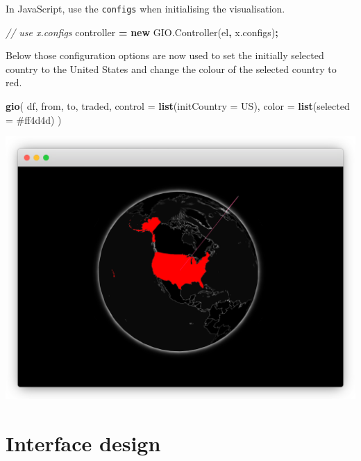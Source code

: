 \documentclass[
]{krantz}
\makeatletter
\newenvironment{Shaded}{\begin{snugshade}}{\end{snugshade}}
\newcommand{\AttributeTok}[1]{\textcolor[rgb]{0.61,0.61,0.61}{#1}}
\newcommand{\CommentTok}[1]{\textcolor[rgb]{0.37,0.37,0.37}{\textit{#1}}}
\newcommand{\DataTypeTok}[1]{\textcolor[rgb]{0.27,0.27,0.27}{#1}}
\newcommand{\KeywordTok}[1]{\textcolor[rgb]{0.27,0.27,0.27}{\textbf{#1}}}
\newcommand{\NormalTok}[1]{#1}
\newcommand{\OperatorTok}[1]{\textcolor[rgb]{0.43,0.43,0.43}{\textbf{#1}}}
\newcommand{\StringTok}[1]{\textcolor[rgb]{0.5,0.5,0.5}{#1}}
\newcommand{\VariableTok}[1]{\textcolor[rgb]{0,0,0}{#1}}
\newenvironment{kframe}{%
\medskip{}
\setlength{\fboxsep}{.8em}
 \def\at@end@of@kframe{}%
 \ifinner\ifhmode%
  \def\at@end@of@kframe{\end{minipage}}%
  \begin{minipage}{\columnwidth}%
 \fi\fi%
 \def\FrameCommand##1{\hskip\@totalleftmargin \hskip-\fboxsep
 \colorbox{shadecolor}{##1}\hskip-\fboxsep
     \hskip-\linewidth \hskip-\@totalleftmargin \hskip\columnwidth}%
 \MakeFramed {\advance\hsize-\width
   \@totalleftmargin\z@ \linewidth\hsize
   \@setminipage}}%
 {\par\unskip\endMakeFramed%
 \at@end@of@kframe}
\renewenvironment{Shaded}{\begin{kframe}}{\end{kframe}}
\makeatother
\begin{document}
In JavaScript, use the \texttt{configs} when initialising the visualisation.

\begin{Shaded}
\begin{Highlighting}[]
\CommentTok{// use x.configs}
\NormalTok{controller }\OperatorTok{=} \KeywordTok{new} \VariableTok{GIO}\NormalTok{.}\AttributeTok{Controller}\NormalTok{(el}\OperatorTok{,} \VariableTok{x}\NormalTok{.}\AttributeTok{configs}\NormalTok{)}\OperatorTok{;}
\end{Highlighting}
\end{Shaded}

Below those configuration options are now used to set the initially selected country to the United States and change the colour of the selected country to red.

\begin{Shaded}
\begin{Highlighting}[]
\KeywordTok{gio}\NormalTok{(}
\NormalTok{  df, from, to, traded, }
  \DataTypeTok{control =} \KeywordTok{list}\NormalTok{(}\DataTypeTok{initCountry =} \StringTok{\textquotesingle{}US\textquotesingle{}}\NormalTok{), }
  \DataTypeTok{color =} \KeywordTok{list}\NormalTok{(}\DataTypeTok{selected =} \StringTok{\textquotesingle{}\#ff4d4d\textquotesingle{}}\NormalTok{)}
\NormalTok{) }
\end{Highlighting}
\end{Shaded}

\includegraphics{images/crosstalk-three-dots.png}

\hypertarget{interface-design}{%
\section{Interface design}\label{interface-design}}
\end{document}
